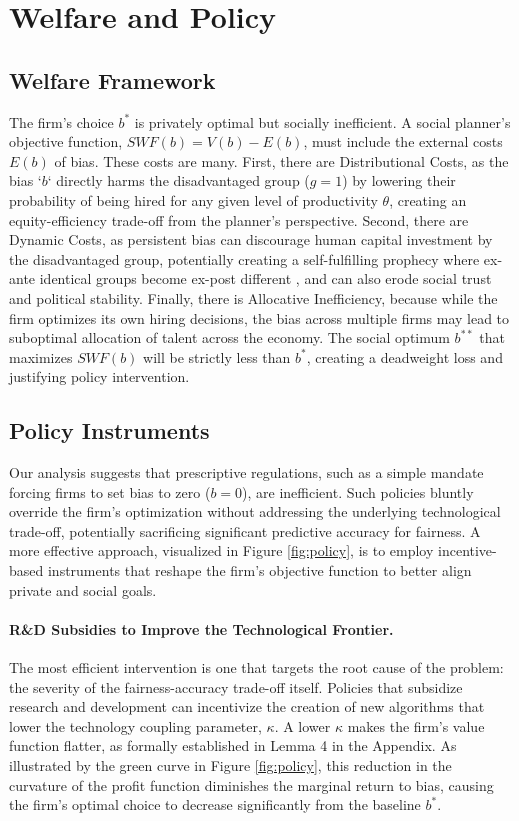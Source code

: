 \section{Welfare and Policy}

\subsection{Welfare Framework}
The firm's choice $b^*$ is privately optimal but socially inefficient. A social planner's objective function, $SWF(b) = V(b) - E(b)$, must include the external costs $E(b)$ of bias. These costs are many. First, there are Distributional Costs, as the bias `$b$` directly harms the disadvantaged group ($g=1$) by lowering their probability of being hired for any given level of productivity $\theta$, creating an equity-efficiency trade-off from the planner's perspective. Second, there are Dynamic Costs, as persistent bias can discourage human capital investment by the disadvantaged group, potentially creating a self-fulfilling prophecy where ex-ante identical groups become ex-post different \citep{Coate1993}, and can also erode social trust and political stability. Finally, there is Allocative Inefficiency, because while the firm optimizes its own hiring decisions, the bias across multiple firms may lead to suboptimal allocation of talent across the economy.
The social optimum $b^{**}$ that maximizes $SWF(b)$ will be strictly less than $b^*$, creating a deadweight loss and justifying policy intervention.

\subsection{Policy Instruments}

Our analysis suggests that prescriptive regulations, such as a simple mandate forcing firms to set bias to zero ($b=0$), are inefficient. Such policies bluntly override the firm's optimization without addressing the underlying technological trade-off, potentially sacrificing significant predictive accuracy for fairness. A more effective approach, visualized in Figure \ref{fig:policy}, is to employ incentive-based instruments that reshape the firm's objective function to better align private and social goals.

\paragraph{R\&D Subsidies to Improve the Technological Frontier.}
The most efficient intervention is one that targets the root cause of the problem: the severity of the fairness-accuracy trade-off itself. Policies that subsidize research and development can incentivize the creation of new algorithms that lower the technology coupling parameter, $\kappa$. A lower $\kappa$ makes the firm's value function flatter, as formally established in Lemma 4 in the Appendix. As illustrated by the green curve in Figure \ref{fig:policy}, this reduction in the curvature of the profit function diminishes the marginal return to bias, causing the firm's optimal choice to decrease significantly from the baseline $b^*$.

